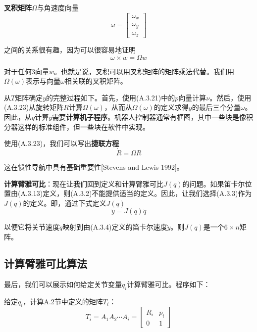 \documentclass[UTF8,a4paper]{ctexart}
\begin{document}
\textbf{叉积矩阵}$\Omega$与角速度向量
\begin{equation}
\omega = \begin{bmatrix} \omega_x \\ \omega_y \\ \omega_z \end{bmatrix}
\tag{A.3.25}
\end{equation}

之间的关系很有趣，因为可以很容易地证明
\begin{equation}
\omega \times w = \Omega w
\tag{A.3.26}
\end{equation}

对于任何3向量$w$。也就是说，叉积可以用叉积矩阵的矩阵乘法代替。我们用$\Omega(\omega)$表示与向量$\omega$相关联的叉积矩阵。

从$T$矩阵确定$y$的完整过程如下。首先，使用(A.3.21)中的$p$向量计算$\nu$。然后，使用(A.3.23)从旋转矩阵$R$计算$\Omega(\omega)$，从而从$\Omega(\omega)$的定义求得$y$的最后三个分量$\omega$。因此，从$q$计算$y$需要\textbf{计算机子程序}。机器人控制器通常有框图，其中一些块是像积分器这样的标准组件，但一些块在软件中实现。

使用(A.3.23)，我们可以写出\textbf{捷联方程}
\begin{equation}
\dot{R} = \Omega R
\tag{A.3.27}
\end{equation}

这在惯性导航中具有基础重要性[Stevens and Lewis 1992]。

\textbf{计算臂雅可比}：现在让我们回到定义和计算臂雅可比$J(q)$的问题。如果笛卡尔位置由(A.3.13)定义，则(A.3.2)不能提供适当的定义。因此，让我们选择(A.3.3)作为$J(q)$的定义。即，通过下式定义$J(q)$
\begin{equation}
\dot{y} = J(q)\dot{q}
\tag{A.3.28}
\end{equation}

以便它将关节速度$\dot{q}$映射到由(A.3.4)定义的笛卡尔速度$\dot{y}$。则$J(q)$是一个$6\times n$矩阵。

\subsection{计算臂雅可比算法}

最后，我们可以展示如何给定关节变量$q_i$计算臂雅可比。程序如下：

给定$q_i$，计算A.2节中定义的矩阵$T_i$：
\begin{equation}
T_i = A_1 A_2 \cdots A_i = \begin{bmatrix} R_i & p_i \\ 0 & 1 \end{bmatrix}
\tag{A.3.29}
\end{equation}
\end{document}
